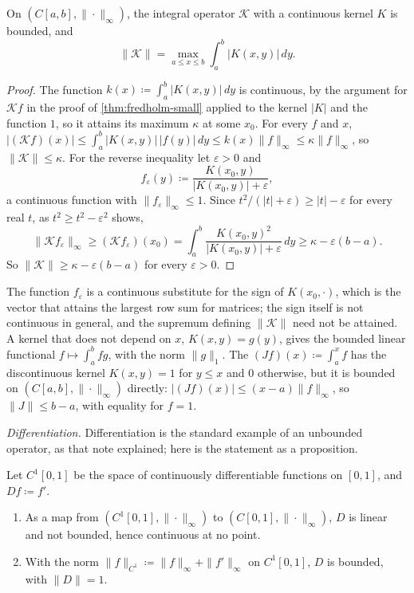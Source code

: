 \begin{proposition}
\label{prop:integral-operator-norm}
On $(C[a,b],\|\cdot\|_\infty)$, the integral operator $\mathcal K$ with a continuous kernel $K$ is bounded, and
\[
\|\mathcal K\|=\max_{a\le x\le b}\int_a^b|K(x,y)|\,dy .
\]
\end{proposition}

\begin{proof}
The function $k(x)\coloneqq\int_a^b|K(x,y)|\,dy$ is continuous, by the argument for $\mathcal Kf$ in the proof of \cref{thm:fredholm-small} applied to the kernel $|K|$ and the function $1$, so it attains its maximum $\kappa$ at some $x_0$. For every $f$ and $x$, $|(\mathcal Kf)(x)|\le\int_a^b|K(x,y)|\,|f(y)|\,dy\le k(x)\|f\|_\infty\le\kappa\|f\|_\infty$, so $\|\mathcal K\|\le\kappa$. For the reverse inequality let $\varepsilon>0$ and
\[
f_\varepsilon(y)\coloneqq\frac{K(x_0,y)}{|K(x_0,y)|+\varepsilon},
\]
a continuous function with $\|f_\varepsilon\|_\infty\le1$. Since $t^2/(|t|+\varepsilon)\ge|t|-\varepsilon$ for every real $t$, as $t^2\ge t^2-\varepsilon^2$ shows,
\[
\|\mathcal Kf_\varepsilon\|_\infty\ge(\mathcal Kf_\varepsilon)(x_0)=\int_a^b\frac{K(x_0,y)^2}{|K(x_0,y)|+\varepsilon}\,dy\ge\kappa-\varepsilon(b-a) .
\]
So $\|\mathcal K\|\ge\kappa-\varepsilon(b-a)$ for every $\varepsilon>0$.
\end{proof}

The function $f_\varepsilon$ is a continuous substitute for the sign of $K(x_0,\cdot)$, which is the vector that attains the largest row sum for matrices; the sign itself is not continuous in general, and the supremum defining $\|\mathcal K\|$ need not be attained. A kernel that does not depend on $x$, $K(x,y)=g(y)$, gives the bounded linear functional $f\mapsto\int_a^bfg$, with the norm $\|g\|_1$. The  $(Jf)(x)\coloneqq\int_a^xf$ has the discontinuous kernel $K(x,y)=1$ for $y\le x$ and $0$ otherwise, but it is bounded on $(C[a,b],\|\cdot\|_\infty)$ directly: $|(Jf)(x)|\le(x-a)\|f\|_\infty$, so $\|J\|\le b-a$, with equality for $f=1$.

\emph{Differentiation.} Differentiation is the standard example of an unbounded operator, as that note explained; here is the statement as a proposition.

\begin{proposition}
\label{prop:differentiation-unbounded}
Let $C^1[0,1]$ be the space of continuously differentiable functions on $[0,1]$, and $Df\coloneqq f'$.
\begin{enumerate}
\item As a map from $(C^1[0,1],\|\cdot\|_\infty)$ to $(C[0,1],\|\cdot\|_\infty)$, $D$ is linear and not bounded, hence continuous at no point.
\item With the norm $\|f\|_{C^1}\coloneqq\|f\|_\infty+\|f'\|_\infty$ on $C^1[0,1]$, $D$ is bounded, with $\|D\|=1$.
\end{enumerate}
\end{proposition}

